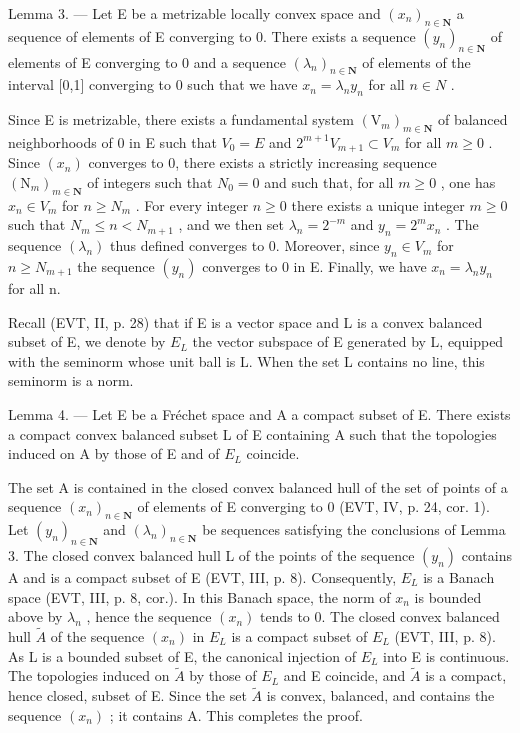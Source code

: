 Lemma 3. --- Let E be a metrizable locally convex space and \((x_{n})_{n\in\mathbf{N}}\) a sequence of elements of E converging to 0. There exists a sequence \((y_{n})_{n\in\mathbf{N}}\) of elements of E converging to 0 and a sequence \((\lambda_{n})_{n\in\mathbf{N}}\) of elements of the interval [0,1] converging to 0 such that we have \(x_{n}=\lambda_{n}y_{n}\) for all \(n\in N\) .

Since E is metrizable, there exists a fundamental system \((\mathrm{V}_{m})_{m\in\mathbf{N}}\) of balanced neighborhoods of 0 in E such that \(V_{0}=E\) and \(2^{m+1}V_{m+1}\subset V_{m}\) for all \(m\geqslant0\) . Since \((x_{n})\) converges to 0, there exists a strictly increasing sequence \((\mathrm{N}_{m})_{m\in\mathbf{N}}\) of integers such that \(N_{0}=0\) and such that, for all \(m\geqslant0\) , one has \(x_{n}\in V_{m}\) for \(n\geqslant N_{m}\) . For every integer \(n\geqslant0\) there exists a unique integer \(m\geqslant0\) such that \(N_{m}\leqslant n<N_{m+1}\) , and we then set \(\lambda_{n}=2^{-m}\) and \(y_{n}=2^{m}x_{n}\) . The sequence \((\lambda_{n})\) thus defined converges to 0. Moreover, since \(y_{n}\in V_{m}\) for \(n\geqslant N_{m+1}\) the sequence \((y_{n})\) converges to 0 in E. Finally, we have \(x_{n}=\lambda_{n}y_{n}\) for all n.

Recall (EVT, II, p. 28) that if E is a vector space and L is a convex balanced subset of E, we denote by \(E_{L}\) the vector subspace of E generated by L, equipped with the seminorm whose unit ball is L. When the set L contains no line, this seminorm is a norm.

Lemma 4. — Let E be a Fréchet space and A a compact subset of E. There exists a compact convex balanced subset L of E containing A such that the topologies induced on A by those of E and of \(E_{L}\) coincide.

The set A is contained in the closed convex balanced hull of the set of points of a sequence \((x_{n})_{n\in\mathbf{N}}\) of elements of E converging to 0 (EVT, IV, p. 24, cor. 1). Let \((y_{n})_{n\in\mathbf{N}}\) and \((\lambda_{n})_{n\in\mathbf{N}}\) be sequences satisfying the conclusions of Lemma 3. The closed convex balanced hull L of the points of the sequence \((y_{n})\) contains A and is a compact subset of E (EVT, III, p. 8). Consequently, \(E_{L}\) is a Banach space (EVT, III, p. 8, cor.). In this Banach space, the norm of \(x_{n}\) is bounded above by \(\lambda_{n}\) , hence the sequence \((x_{n})\) tends to 0. The closed convex balanced hull \(\widetilde{A}\) of the sequence \((x_{n})\) in \(E_{L}\) is a compact subset of \(E_{L}\) (EVT, III, p. 8). As L is a bounded subset of E, the canonical injection of \(E_{L}\) into E is continuous. The topologies induced on \(\widetilde{A}\) by those of \(E_{L}\) and E coincide, and \(\widetilde{A}\) is a compact, hence closed, subset of E. Since the set \(\widetilde{A}\) is convex, balanced, and contains the sequence \((x_{n})\) ; it contains A. This completes the proof.

